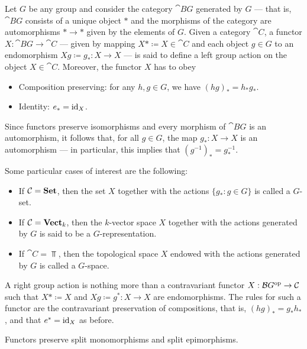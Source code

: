 \begin{example}\label{exp:grp-action}
Let \(G\) be any group and consider the category \(\cat{B}G\) generated by \(G\)
--- that is, \(\cat BG\) consists of a unique object \(*\) and the morphisms of
the category are automorphisms \(* \to *\) given by the elements of \(G\). Given
a category \(\cat C\), a functor \(X: \cat BG \to \cat C\) --- given by mapping
\(X* \coloneq X \in \cat C\) and each object \(g \in G\) to an endomorphism
\(Xg \coloneq g_{*}: X \to X\) --- is said to define a left group action on the
object \(X \in \cat C\). Moreover, the functor \(X\) has to obey
\begin{itemize}\setlength\itemsep{0em}
\item Composition preserving: for any \(h, g \in G\), we have \((h g)_{*} =
  h_{*} g_{*}\).
\item Identity: \(e_{*} = \operatorname{id}_X\).
\end{itemize}
Since functors preserve isomorphisms and every morphism of \(\cat BG\) is an
automorphism, it follows that, for all \(g \in G\), the map \(g_{*}: X \to X\)
is an automorphism --- in particular, this implies that \((g^{-1})_{*} =
g_{*}^{-1}\).

Some particular cases of interest are the following:
\begin{itemize}\setlength\itemsep{0em}
\item If \(\mathcal C = {\textbf{Set}}\), then the set \(X\) together with the actions
  \(\{g_{*} \colon g \in G\}\) is called a \(G\)-set.
\item If \(\mathcal C = {\textbf{Vect}}_k\), then the \(k\)-vector space \(X\) together with
  the actions generated by \(G\) is said to be a \(G\)-representation.
\item If \(\cat C = \Top\), then the topological space \(X\) endowed with the
  actions generated by \(G\) is called a \(G\)-space.
\end{itemize}

A right group action is nothing more than a contravariant functor \(X: \mathcal
BG^{\mathrm{op}} \to \mathcal C\) such that \(X* \coloneq X\) and \(Xg \coloneq g^{*}: X \to
X\) are endomorphisms. The rules for such a functor are the contravariant
preservation of compositions, that is, \((h g)_{*} = g_{*} h_{*}\), and that
\(e^{*} = \operatorname{id}_X\) as before.
\end{example}

\begin{lemma}\label{lem: func-preserve-split}
Functors preserve split monomorphisms and split epimorphisms.
\end{lemma}


